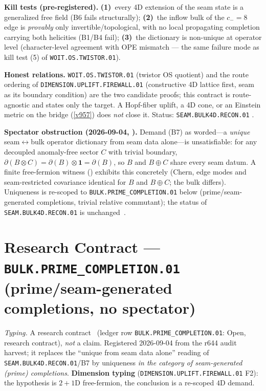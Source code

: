 \par\smallskip\noindent\textbf{Kill tests (pre-registered).}
\textbf{(1)}~every 4D extension of the seam state is a generalized free field (B6 fails
structurally); \textbf{(2)}~the inflow bulk of the $c_-{=}8$ edge is \emph{provably} only
invertible/topological, with no local propagating completion carrying both helicities (B1/B4
fail); \textbf{(3)}~the dictionary is non-unique at operator level (character-level agreement
with OPE mismatch --- the same failure mode as kill test (5) of \texttt{WOIT.OS.TWISTOR.01}).

\par\smallskip\noindent\textbf{Honest relations.} \texttt{WOIT.OS.TWISTOR.01} (twistor OS
quotient) and the route ordering of \texttt{DIMENSION.UPLIFT.FIREWALL.01} (constructive 4D
lattice first, seam as its boundary condition) are the two candidate proofs; this contract is
route-agnostic and states only the target.  A Hopf-fiber uplift, a 4D cone, or an Einstein
metric on the bridge (\vref{v957}) does \emph{not} close it.  Status:
\texttt{SEAM.BULK4D.RECON.01} \mO.

\par\smallskip\noindent\textbf{Spectator obstruction (2026-09-04, ).}
Demand (B7) as worded---a \emph{unique} seam$\leftrightarrow$bulk operator dictionary from seam data
alone---is unsatisfiable: for any decoupled anomaly-free sector $C$ with trivial boundary,
$\partial(B\otimes C)=\partial(B)\otimes\mathbf 1=\partial(B)$, so $B$ and $B\oplus C$ share every
seam datum.  A finite free-fermion witness ()
exhibits this concretely (Chern, edge modes and seam-restricted covariance identical for $B$ and
$B\oplus C$; the bulk differs).  Uniqueness is re-scoped to
\texttt{BULK.PRIME\_COMPLETION.01} below (prime/seam-generated completions, trivial
relative commutant); the status of \texttt{SEAM.BULK4D.RECON.01} is unchanged~\mO.

\section*{Research Contract --- \texttt{BULK.PRIME\_COMPLETION.01} (prime/seam-generated completions, no spectator)}
\noindent\emph{Typing.} A research contract \mO\ (ledger row
\texttt{BULK.PRIME\_COMPLETION.01}: Open, research contract), \emph{not} a claim.
Registered 2026-09-04 from the r644 audit harvest; it replaces the ``unique from seam
data alone'' reading of \texttt{SEAM.BULK4D.RECON.01}/B7 by uniqueness \emph{in the
category of seam-generated (prime) completions}.  \textbf{Dimension typing}
(\texttt{DIMENSION.UPLIFT.FIREWALL.01} F2): the hypothesis is $2{+}1$D free-fermion,
the conclusion is a re-scoped $4$D demand.

